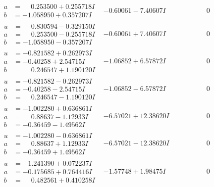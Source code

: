 \documentclass[1p]{elsarticle_modified}
\theoremstyle{definition}
\begin{document}
$$\begin{array}{c|c|c}
\begin{aligned}
a &= \phantom{-}0.253500 + 0.255718 I \\
b &= -1.058950 + 0.357207 I\end{aligned}
 & -0.60061 - 7.40607 I & \phantom{-0.000000 } 0 \\ \hline\begin{aligned}
u &= \phantom{-}0.830594 - 0.329150 I \\
a &= \phantom{-}0.253500 - 0.255718 I \\
b &= -1.058950 - 0.357207 I\end{aligned}
 & -0.60061 + 7.40607 I & \phantom{-0.000000 } 0 \\ \hline\begin{aligned}
u &= -0.821582 + 0.262973 I \\
a &= -0.40258 + 2.54715 I \\
b &= \phantom{-}0.246547 + 1.190120 I\end{aligned}
 & -1.06852 + 6.57872 I & \phantom{-0.000000 } 0 \\ \hline\begin{aligned}
u &= -0.821582 - 0.262973 I \\
a &= -0.40258 - 2.54715 I \\
b &= \phantom{-}0.246547 - 1.190120 I\end{aligned}
 & -1.06852 - 6.57872 I & \phantom{-0.000000 } 0 \\ \hline\begin{aligned}
u &= -1.002280 + 0.636861 I \\
a &= \phantom{-}0.88637 - 1.12933 I \\
b &= -0.36459 - 1.49562 I\end{aligned}
 & -6.57021 + 12.38620 I & \phantom{-0.000000 } 0 \\ \hline\begin{aligned}
u &= -1.002280 - 0.636861 I \\
a &= \phantom{-}0.88637 + 1.12933 I \\
b &= -0.36459 + 1.49562 I\end{aligned}
 & -6.57021 - 12.38620 I & \phantom{-0.000000 } 0 \\ \hline\begin{aligned}
u &= -1.241390 + 0.072237 I \\
a &= -0.175685 + 0.764416 I \\
b &= \phantom{-}0.482561 + 0.410258 I\end{aligned}
 & -1.57748 + 1.98475 I & \phantom{-0.000000 } 0 \\ \hline\begin{aligned}

\end{aligned}
\end{array}$$
\end{document}

